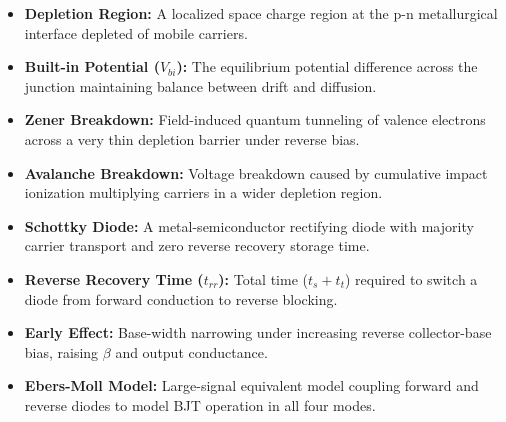 \documentclass[12pt,a4paper]{article}
\begin{document}
\begin{tcolorbox}[defbox, title={\textbf{One-Line Definitions}}]
\begin{itemize}[leftmargin=*, itemsep=2pt, topsep=0pt]
  \item \textbf{Depletion Region:} A localized space charge region at the p-n metallurgical interface depleted of mobile carriers.
  \item \textbf{Built-in Potential ($V_{bi}$):} The equilibrium potential difference across the junction maintaining balance between drift and diffusion.
  \item \textbf{Zener Breakdown:} Field-induced quantum tunneling of valence electrons across a very thin depletion barrier under reverse bias.
  \item \textbf{Avalanche Breakdown:} Voltage breakdown caused by cumulative impact ionization multiplying carriers in a wider depletion region.
  \item \textbf{Schottky Diode:} A metal-semiconductor rectifying diode with majority carrier transport and zero reverse recovery storage time.
  \item \textbf{Reverse Recovery Time ($t_{rr}$):} Total time ($t_s + t_t$) required to switch a diode from forward conduction to reverse blocking.
  \item \textbf{Early Effect:} Base-width narrowing under increasing reverse collector-base bias, raising $\beta$ and output conductance.
  \item \textbf{Ebers-Moll Model:} Large-signal equivalent model coupling forward and reverse diodes to model BJT operation in all four modes.
\end{itemize}
\end{tcolorbox}
\end{document}
